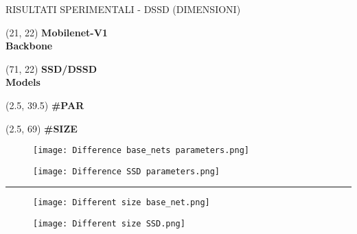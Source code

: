
\begin{frame}{RISULTATI SPERIMENTALI - DSSD (DIMENSIONI)}
    \centering
    \begin{textblock}{40}(21, 22)
        \bfseries{Mobilenet-V1\\Backbone}
    \end{textblock}
    \begin{textblock}{40}(71, 22)
        \bfseries{SSD/DSSD\\Models}
    \end{textblock}
    \begin{textblock}{5}(2.5, 39.5)
        \bfseries{\#PAR}
    \end{textblock}
    \begin{textblock}{5}(2.5, 69)
        \bfseries{\#SIZE}
    \end{textblock}
    \vspace{0.8cm}
    \begin{minipage}{\linewidth}
        \centering
        \begin{minipage}{0.45\linewidth}
            \begin{figure}
                \centering
                \texttt{[image: Difference base\_nets parameters.png]}
                \centering
            \end{figure}
        \end{minipage}
        \begin{minipage}{0.45\linewidth}
            \begin{figure}
                \centering
                \texttt{[image: Difference SSD parameters.png]}
                \centering
            \end{figure}
        \end{minipage}
        \vspace{0.3cm}
    \end{minipage}
    {\rule{\textwidth}{2pt}}
    \begin{minipage}{\linewidth}
        \vspace{0.3cm}
        \centering
        \begin{minipage}{0.45\linewidth}
            \begin{figure}
                \centering
                \texttt{[image: Different size base\_net.png]}
                \centering
            \end{figure}
        \end{minipage}
        \begin{minipage}{0.45\linewidth}
            \begin{figure}
                \centering
                \texttt{[image: Different size SSD.png]}
                \centering
            \end{figure}
        \end{minipage}
    \end{minipage}  
\end{frame}

